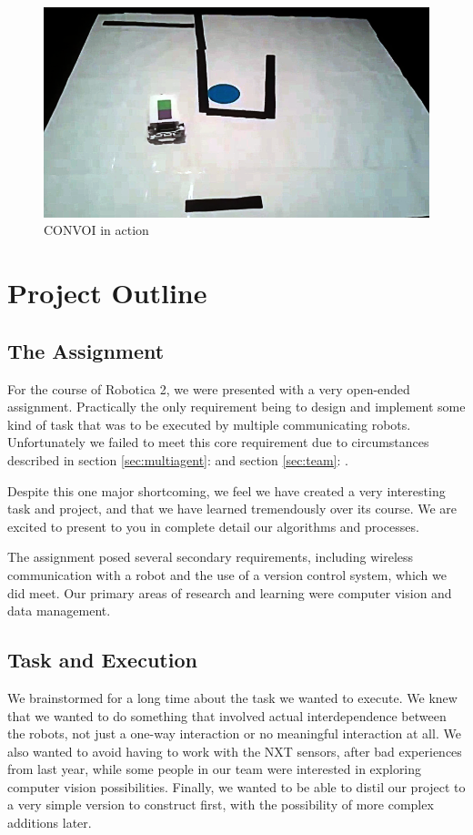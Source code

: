 \documentclass[10pt, abstracton, twocolumn]{scrartcl}
\newcommand{\sref}[1]{section \vref{#1}: \nameref{#1}}
\begin{document}
\twocolumn
\begin{figure}
        \centering
        \includegraphics[width=\columnwidth]{pictures/photo1.png}
        \caption{\small CONVOI in action}
        \label{fig:photo1}
\end{figure}

\section{Project Outline}

\subsection{The Assignment}
For the course of Robotica 2, we were presented with a very open-ended assignment. Practically the only requirement being to design and implement some kind of task that was to be executed by multiple communicating robots. Unfortunately we failed to meet this core requirement due to circumstances described in \sref{sec:multiagent} and \sref{sec:team}.

Despite this one major shortcoming, we feel we have created a very interesting task and project, and that we have learned tremendously over its course. We are excited to present to you in complete detail our algorithms and processes.

The assignment posed several secondary requirements, including wireless communication with a robot and the use of a version control system, which we did meet. Our primary areas of research and learning were computer vision and data management.

\subsection{Task and Execution}
We brainstormed for a long time about the task we wanted to execute. We knew that we wanted to do something that involved actual interdependence between the robots, not just a one-way interaction or no meaningful interaction at all. We also wanted to avoid having to work with the NXT sensors, after bad experiences from last year, while some people in our team were interested in exploring computer vision possibilities. Finally, we wanted to be able to distil our project to a very simple version to construct first, with the possibility of more complex additions later.
\end{document}
